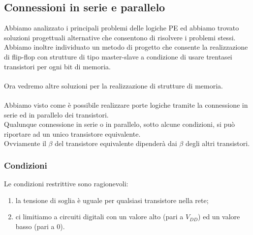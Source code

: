\documentclass[../main.tex]{subfiles}
\begin{document}
	\subsection{Connessioni in serie e parallelo}
	Abbiamo analizzato i principali problemi delle logiche PE ed abbiamo trovato soluzioni progettuali alternative che consentono di risolvere i problemi stessi.\\
	Abbiamo inoltre individuato un metodo di progetto che consente la realizzazione di flip-flop con strutture di tipo master-slave a condizione di usare trentasei transistori per ogni bit di memoria.\\\\
	Ora vedremo altre soluzioni per la realizzazione di strutture di memoria.\\\\
	Abbiamo visto come è possibile realizzare porte logiche tramite la connessione in serie ed in parallelo dei transistori.\\
	Qualunque connessione in serie o in parallelo, sotto alcune condizioni, si può riportare ad un unico transistore equivalente.\\
	Ovviamente il $\beta$ del transistore equivalente dipenderà dai $\beta$ degli altri transistori.
	\subsubsection{Condizioni}
	Le condizioni restrittive sono ragionevoli:
	\begin{enumerate}
		\item la tensione di soglia è uguale per qualsiasi transistore nella rete;
		\item ci limitiamo a circuiti digitali con un valore alto (pari a $V_{DD}$) ed un valore basso (pari a 0).
	\end{enumerate}
\end{document}
